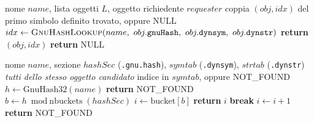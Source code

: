 \documentclass[11pt]{article}
\begin{document}
\begin{algorithm}[h]
\caption{\textsc{RisolviSimbolo} --- individua \emph{in quale} oggetto del
grafo il simbolo e' definito, seguendo lo scope globale}
\begin{algorithmic}[1]
\REQUIRE nome $name$, lista oggetti $L$, oggetto richiedente $requester$
\ENSURE coppia $(obj, idx)$ del primo simbolo definito trovato, oppure NULL
    \STATE $idx \gets \textsc{GnuHashLookup}(name,\ obj.\texttt{gnuHash},\ obj.\texttt{dynsym},\ obj.\texttt{dynstr})$
        \STATE \textbf{return} $(obj, idx)$ 
    \ENDIF
\ENDFOR
\STATE \textbf{return} NULL
\end{algorithmic}
\end{algorithm}

\begin{algorithm}[h]
\caption{\textsc{GnuHashLookup} --- ricerca del simbolo dentro un singolo
oggetto, tramite \texttt{.gnu.hash}}
\begin{algorithmic}[1]
\REQUIRE nome $name$, sezione $hashSec$ (\texttt{.gnu.hash}), $symtab$ (\texttt{.dynsym}), $strtab$ (\texttt{.dynstr}) \emph{tutti dello stesso oggetto candidato}
\ENSURE indice in $symtab$, oppure NOT\_FOUND
\STATE $h \gets \text{GnuHash32}(name)$
    \STATE \textbf{return} NOT\_FOUND 
\ENDIF
\STATE $b \gets h \bmod \text{nbuckets}(hashSec)$
\STATE $i \gets \text{bucket}[b]$
     
         
            \STATE \textbf{return} $i$
        \ENDIF
    \ENDIF
        \STATE \textbf{break} 
    \ENDIF
    \STATE $i \gets i + 1$
\ENDWHILE
\STATE \textbf{return} NOT\_FOUND
\end{algorithmic}
\end{algorithm}
\end{document}

